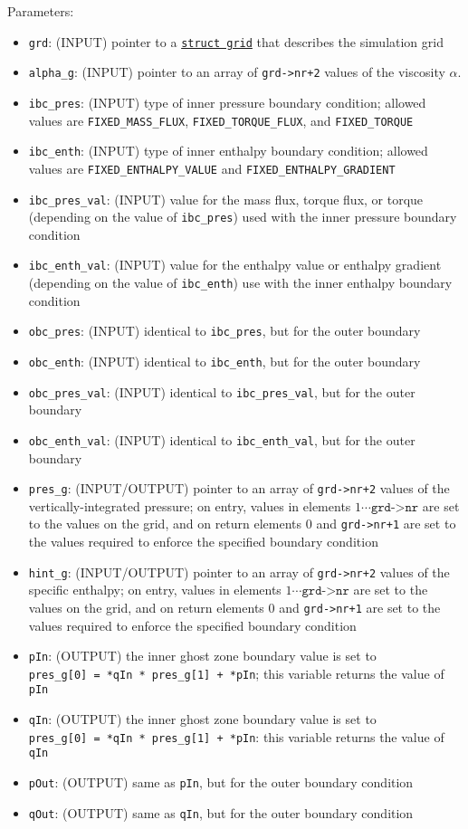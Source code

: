 \documentclass[12pt]{article}
\begin{document}
Parameters:
\begin{itemize}
\item \texttt{grd}: (INPUT) pointer to a \hyperref[sssec:datastructures]{\texttt{struct grid}} that describes the simulation grid
\item \verb=alpha_g=: (INPUT) pointer to an array of \verb=grd->nr+2= values of the viscosity $\alpha$.
\item \verb=ibc_pres=: (INPUT) type of inner pressure boundary condition; allowed values are \verb=FIXED_MASS_FLUX=, \verb=FIXED_TORQUE_FLUX=, and \verb=FIXED_TORQUE=
\item \verb=ibc_enth=: (INPUT) type of inner enthalpy boundary condition; allowed values are \verb=FIXED_ENTHALPY_VALUE= and \verb=FIXED_ENTHALPY_GRADIENT=
\item \verb=ibc_pres_val=: (INPUT) value for the mass flux, torque flux, or torque (depending on the value of \verb=ibc_pres=) used with the inner pressure boundary condition
\item \verb=ibc_enth_val=: (INPUT) value for the enthalpy value or enthalpy gradient (depending on the value of \verb=ibc_enth=) use with the inner enthalpy boundary condition
\item \verb=obc_pres=: (INPUT) identical to \verb=ibc_pres=, but for the outer boundary
\item \verb=obc_enth=: (INPUT) identical to \verb=ibc_enth=, but for the outer boundary
\item \verb=obc_pres_val=: (INPUT) identical to \verb=ibc_pres_val=, but for the outer boundary
\item \verb=obc_enth_val=: (INPUT) identical to \verb=ibc_enth_val=, but for the outer boundary
\item \verb=pres_g=: (INPUT/OUTPUT) pointer to an array of \verb=grd->nr+2= values of the vertically-integrated pressure; on entry, values in elements $1\cdots \texttt{grd->nr}$ are set to the values on the grid, and on return elements $0$ and \texttt{grd->nr+1} are set to the values required to enforce the specified boundary condition
\item \verb=hint_g=: (INPUT/OUTPUT) pointer to an array of \verb=grd->nr+2= values of the specific enthalpy; on entry, values in elements $1\cdots \texttt{grd->nr}$ are set to the values on the grid, and on return elements $0$ and \texttt{grd->nr+1} are set to the values required to enforce the specified boundary condition
\item \verb=pIn=: (OUTPUT) the inner ghost zone boundary value is set to\\
\verb!pres_g[0] = *qIn * pres_g[1] + *pIn!; this variable returns the value of \verb=pIn=
\item \verb=qIn=: (OUTPUT) the inner ghost zone boundary value is set to\\
\verb!pres_g[0] = *qIn * pres_g[1] + *pIn!: this variable returns the value of \verb=qIn=
\item \verb=pOut=: (OUTPUT) same as \verb=pIn=, but for the outer boundary condition
\item \verb=qOut=: (OUTPUT) same as \verb=qIn=, but for the outer boundary condition
\end{itemize}
\end{document}
